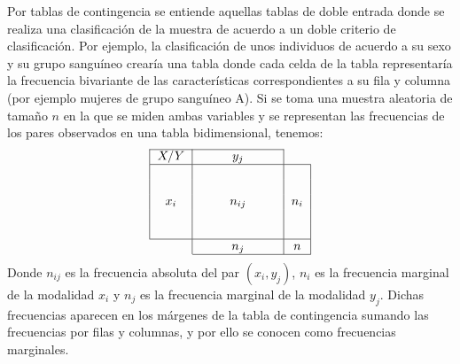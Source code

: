 Por tablas de contingencia se entiende aquellas tablas de doble entrada donde se realiza una clasificación de la muestra de acuerdo a un
doble criterio de clasificación. Por ejemplo, la clasificación de unos individuos de acuerdo a su sexo y su grupo sanguíneo crearía una
tabla donde cada celda de la tabla representaría la frecuencia bivariante de las características correspondientes a su fila y columna (por
ejemplo mujeres de grupo sanguíneo A). Si se toma una muestra aleatoria de tamaño $n$ en la que se miden ambas variables y se representan
las frecuencias de los pares observados en una tabla bidimensional, tenemos:
\[
\begin{tabular}{|l|lllll|l|}
\cline{1-6}
$X/Y$ & \multicolumn{1}{c}{} & \multicolumn{1}{c}{} & \multicolumn{1}{c}{$y_j$} & \multicolumn{1}{c}{} & \multicolumn{1}{c|}{} & \multicolumn{1}{l}{} \\
\hline
\multicolumn{1}{|c|}{} & \multicolumn{1}{c}{} & \multicolumn{1}{c}{} & \multicolumn{1}{c}{} & \multicolumn{1}{c}{} & \multicolumn{1}{c|}{} & \multicolumn{1}{c|}{} \\
\multicolumn{1}{|c|}{} & \multicolumn{1}{c}{} & \multicolumn{1}{c}{} & \multicolumn{1}{c}{} & \multicolumn{1}{c}{} & \multicolumn{1}{c|}{} & \multicolumn{1}{c|}{} \\
\multicolumn{1}{|c|}{$x_i$} & \multicolumn{1}{c}{} & \multicolumn{1}{c}{} & \multicolumn{1}{c}{$n_{ij}$} & \multicolumn{1}{c}{} & \multicolumn{1}{c|}{} & \multicolumn{1}{c|}{$n_i$} \\
\multicolumn{1}{|c|}{} & \multicolumn{1}{c}{} & \multicolumn{1}{c}{} & \multicolumn{1}{c}{} & \multicolumn{1}{c}{} & \multicolumn{1}{c|}{} & \multicolumn{1}{c|}{} \\
\multicolumn{1}{|c|}{} & \multicolumn{1}{c}{} & \multicolumn{1}{c}{} & \multicolumn{1}{c}{} & \multicolumn{1}{c}{} & \multicolumn{1}{c|}{} & \multicolumn{1}{c|}{} \\
\hline
\multicolumn{1}{c|}{} & \multicolumn{1}{c}{} & \multicolumn{1}{c}{} & \multicolumn{1}{c}{$n_j$} & \multicolumn{1}{c}{} & \multicolumn{1}{c|}{} & \multicolumn{1}{c|}{$n$} \\
\cline{2-7}
\end{tabular}
\]
Donde $n_{ij}$ es la frecuencia absoluta del par $(x_i, y_j)$, $n_i$ es la frecuencia marginal de la modalidad $x_i$ y $n_j$ es la
frecuencia marginal de la modalidad $y_j$. Dichas frecuencias aparecen en los márgenes de la tabla de contingencia sumando las frecuencias
por filas y columnas, y por ello se conocen como frecuencias marginales.

